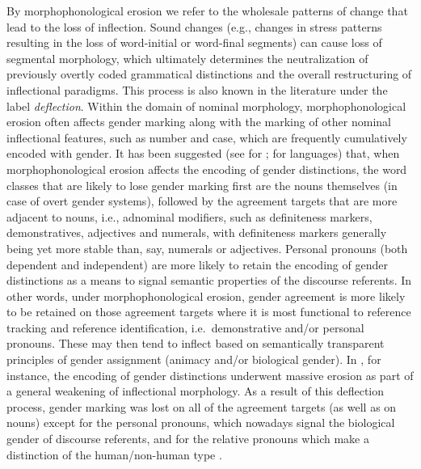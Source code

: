 \documentclass[output=collectionpaper]{langsci/langscibook}
\begin{document}
By morphophonological erosion we refer to the wholesale patterns of change that lead to the loss of inflection. Sound changes (e.g., changes in stress patterns resulting in the loss of word-initial or word-final segments) can cause loss of segmental morphology, which ultimately determines the neutralization of previously overtly coded grammatical distinctions and the overall restructuring of inflectional paradigms. This process is also known in the literature under the label \textit{deflection}. Within the domain of nominal morphology, morphophonological erosion often affects gender marking along with the marking of other nominal inflectional features, such as number and case, which are frequently cumulatively encoded with gender. It has been suggested (see \citealt{Priestly1983} for ; \citealt{Audring2009} for  languages) that, when morphophonological erosion affects the encoding of gender distinctions, the word classes that are likely to lose gender marking first are the nouns themselves (in case of overt gender systems), followed by the agreement targets that are more adjacent to nouns, i.e., adnominal modifiers, such as definiteness markers, demonstratives, adjectives and numerals, with definiteness markers generally being yet more stable than, say, numerals or adjectives. Personal pronouns (both dependent and independent) are more likely to retain the encoding of gender distinctions as a means to signal semantic properties of the discourse referents. In other words, under morphophonological erosion, gender agreement is more likely to be retained on those agreement targets where it is most functional to reference tracking and reference identification, i.e.\ demonstrative and/or personal pronouns. These may then tend to inflect based on semantically transparent principles of gender assignment (animacy and/or biological gender). In , for instance, the encoding of gender distinctions underwent massive erosion as part of a general weakening of inflectional morphology. As a result of this deflection process, gender marking was lost on all of the agreement targets (as well as on nouns) except for the personal pronouns, which nowadays signal the biological gender of discourse referents, and for the relative pronouns which make a distinction of the human/non-human type \citep{Curzan2003}.
\end{document}
